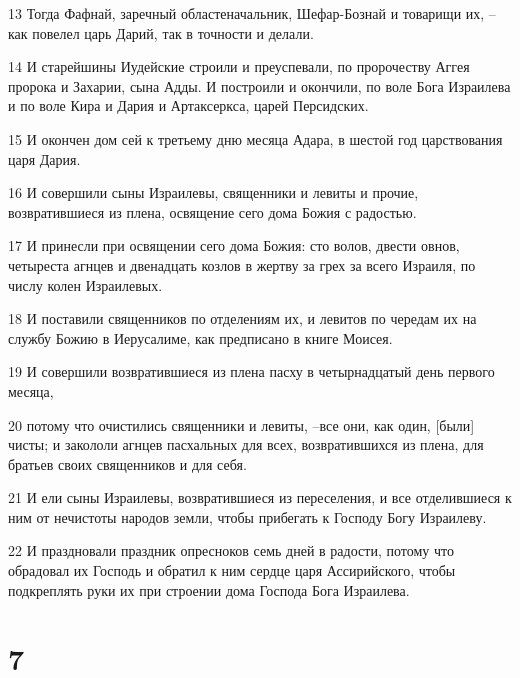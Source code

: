 \par 13 Тогда Фафнай, заречный областеначальник, Шефар-Бознай и товарищи их, --как повелел царь Дарий, так в точности и делали.
\par 14 И старейшины Иудейские строили и преуспевали, по пророчеству Аггея пророка и Захарии, сына Адды. И построили и окончили, по воле Бога Израилева и по воле Кира и Дария и Артаксеркса, царей Персидских.
\par 15 И окончен дом сей к третьему дню месяца Адара, в шестой год царствования царя Дария.
\par 16 И совершили сыны Израилевы, священники и левиты и прочие, возвратившиеся из плена, освящение сего дома Божия с радостью.
\par 17 И принесли при освящении сего дома Божия: сто волов, двести овнов, четыреста агнцев и двенадцать козлов в жертву за грех за всего Израиля, по числу колен Израилевых.
\par 18 И поставили священников по отделениям их, и левитов по чередам их на службу Божию в Иерусалиме, как предписано в книге Моисея.
\par 19 И совершили возвратившиеся из плена пасху в четырнадцатый день первого месяца,
\par 20 потому что очистились священники и левиты, --все они, как один, [были] чисты; и закололи агнцев пасхальных для всех, возвратившихся из плена, для братьев своих священников и для себя.
\par 21 И ели сыны Израилевы, возвратившиеся из переселения, и все отделившиеся к ним от нечистоты народов земли, чтобы прибегать к Господу Богу Израилеву.
\par 22 И праздновали праздник опресноков семь дней в радости, потому что обрадовал их Господь и обратил к ним сердце царя Ассирийского, чтобы подкреплять руки их при строении дома Господа Бога Израилева.

\chapter{7}

